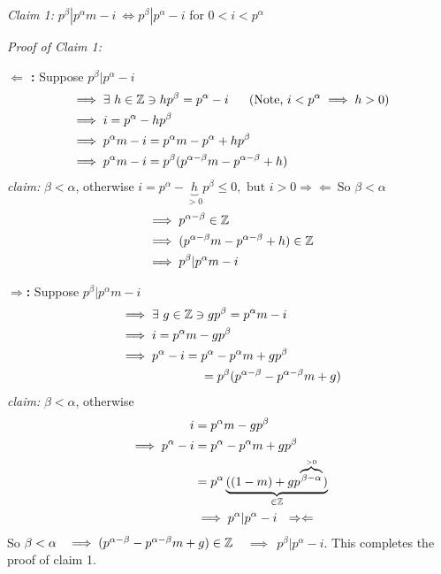 \noindent \textit{Claim 1: } $p^\beta | p^\alpha m - i \ \iff p^\beta | p^\alpha - i$  for
$0<i<p^\alpha$\steezybreak

\noindent \textit{Proof of Claim 1:}\steezybreak

\noindent \textbf{$\Leftarrow$ :} Suppose $p^\beta | p^\alpha -i $
\begin{align}
  &\implies \exists \ h \in \Z \ni hp^\beta = p^\alpha - i \ \ \ \ \ (\text{Note, }i<p^\alpha \implies h > 0)\nonumber \\
  &\implies i = p^\alpha - hp^\beta \nonumber \\
  &\implies p^\alpha m -i = p^\alpha m - p^\alpha + hp^\beta \nonumber \\
  &\implies p^\alpha m -i = p^\beta (p^{\alpha-\beta}m-p^{\alpha-\beta}+h) \nonumber
\end{align}
\indent \textit{claim: } $\beta < \alpha$, otherwise
$i=p^\alpha - \underbrace{h}_{>0}p^\beta \leq 0, \text{ but } i>0 \Rightarrow \Leftarrow \ \text{So } \beta < \alpha$
\begin{align}
    &\implies p^{\alpha -\beta} \in {\mathbb{Z}} \nonumber \\
    &\implies (p^{\alpha-\beta}m-p^{\alpha-\beta}+h) \in {\mathbb{Z}} \nonumber \\
    &\implies p^\beta | p^\alpha m -i \nonumber
\end{align}

\textbf{$\Rightarrow$:} Suppose $p^\beta | p^\alpha m -i$
\begin{align}
    &\implies \exists \ g \in {\mathbb{Z}} \ni gp^\beta = p^\alpha m -i \nonumber \\
    &\implies i = p^\alpha m -gp^\beta \nonumber \\
    &\implies p^\alpha - i = p^\alpha - p^\alpha m + gp^\beta \nonumber \\
    & \ \ \ \ \ \ \ \ \ \ \ \ \ \ \ \ \ \ \ \ = p^\beta (p^{\alpha-\beta} -p^{\alpha-\beta}m + g) \nonumber
\end{align}
\indent \textit{claim: } $\beta < \alpha$, otherwise
\begin{align}
    i &= p^\alpha m - gp^\beta \nonumber \\
    \implies p^\alpha -i &= p^\alpha - p^\alpha m + gp^\beta \nonumber \\
    &= p^\alpha \underbrace{((1-m)+gp^{\overbrace{\scriptstyle\beta-\alpha}^{>0}})}_{\in {\mathbb{Z}}} \nonumber \\
    &\implies p^\alpha | p^\alpha - i \ \ \Rightarrow\Leftarrow \nonumber
\end{align}
So $\beta < \alpha \ \ \implies (p^{\alpha-\beta}-p^{\alpha-\beta}m+g)\in \Z$
$ \ \ \ \implies \ \ p^\beta | p^\alpha - i$. This completes the proof of claim 1. \steezybreak

